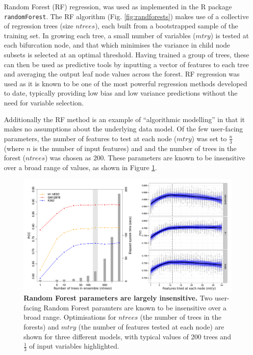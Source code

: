 \documentclass[a4paper,11pt,oneside]{book}
\begin{document}
Random Forest (RF) regression,\cite{Breiman2001a}  was used
as implemented in the R package \texttt{randomForest}.\cite{Liaw2002}
The RF algorithm (Fig. \ref{fig:randforests}) makes use of a collective of regression trees (size $ntrees$), each built from a
bootstrapped sample of the training set. In growing each tree, a small
number of variables ($mtry$) is tested at each bifurcation node, and that which minimises the
variance in child node subsets is selected at an optimal threshold. Having trained a group of trees, these can then be used as
predictive tools by inputting a vector of features to each tree and
averaging the output leaf node values across the forest. RF regression
was used as it is known to be one of the most powerful regression
methods developed to date,\cite{Svetnik2003, Cutler2007} typically
providing low bias and low variance predictions without the need for
variable selection.\cite{Diaz2006, Dasgupta2012}

Additionally the RF method is an example of ``algorithmic
modelling''\cite{Breiman2001b} in that it makes no assumptions about the
underlying data model.
Of the few user-facing parameters, the number of features to test at each node ($mtry$) was set to $\frac{n}{3}$ (where $n$ is the number of input features) and and the number of trees in the forest ($ntrees$) was chosen as
$200$. These parameters are known to be insensitive over a broad range of values,\cite{Dasgupta2012, Hastie2001} as shown in Figure \ref{fig:rfparam}.

\begin{figure}
\begin{center}
\includegraphics[width=5in]{figs/rfparams.pdf}
\captionsetup{width=\textwidth}
\caption[Random Forest parameters are largely insensitive.]{ {\bf Random Forest parameters are largely insensitive. } 
Two user-facing Random Forest paramters are known to be insensitive over a broad range.\cite{Hastie2001} Optimisations for $ntrees$ (the number of trees in the forests) and $mtry$ (the number of features tested at each node) are shown for three different models, with typical values of 200 trees and $\frac{1}{3}$ of input variables highlighted.
}\label{fig:rfparam}
\end{center}
\end{figure} 
\end{document}
